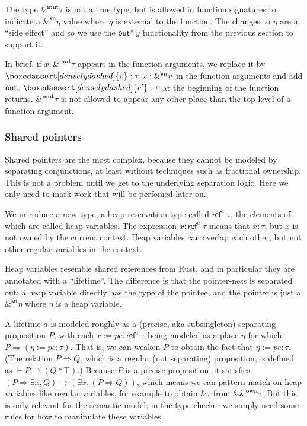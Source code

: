 \documentclass[acmsmall,nonacm]{acmart}
\newcommand*{\ghost}[1]{\boxedassert[densely dashed]{#1}}
\newcommand{\proves}{\vdash}
\begin{document}
The type $\&^\mathbf{mut}\tau$ is not a true type, but is allowed in function signatures to indicate a $\&^\mathbf{sn}\eta$ value where $\eta$ is external to the function. The changes to $\eta$ are a ``side effect'' and so we use the $\mathsf{out}^x\;y$ functionality from the previous section to support it.

In brief, if $x:\&^\mathbf{mut}\tau$ appears in the function arguments, we replace it by $\ghost v:\tau,x:\&^\mathbf{sn}v$ in the function arguments and add $\mathsf{out}_v\;\ghost{v'}:\tau$ at the beginning of the function returns. $\&^\mathbf{mut}\tau$ is not allowed to appear any other place than the top level of a function argument.

\subsubsection{Shared pointers}

Shared pointers are the most complex, because they cannot be modeled by separating conjunctions, at least without techniques such as fractional ownership. This is not a problem until we get to the underlying separation logic. Here we only need to mark work that will be perfomed later on.

We introduce a new type, a heap reservation type called $\mathsf{ref}^a\;\tau$, the elements of which are called heap variables. The expression $x:\mathsf{ref}^a\;\tau$ means that $x:\tau$, but $x$ is not owned by the current context. Heap variables can overlap each other, but not other regular variables in the context.

Heap variables resemble shared references from Rust, and in particular they are annotated with a ``lifetime''. The difference is that the pointer-ness is separated out; a heap variable directly has the type of the pointee, and the pointer is just a $\&^\mathbf{sn}\eta$ where $\eta$ is a heap variable.

A lifetime $a$ is modeled roughly as a (precise, aka subsingleton) separating proposition $P$, with each $x:=pe:\mathsf{ref}^a\;\tau$ being modeled as a place $\eta$ for which $P\Rightarrow (\eta:=pe:\tau)$. That is, we can weaken $P$ to obtain the fact that $\eta:=pe:\tau$. (The relation $P\Rightarrow Q$, which is a regular (not separating) proposition, is defined as $\proves P\to (Q*\top)$.) Because $P$ is a precise proposition, it satisfies $(P\Rightarrow \exists x, Q)\to (\exists x,(P\Rightarrow Q))$, which means we can pattern match on heap variables like regular variables, for example to obtain $\&\tau$ from $\&\&^\mathbf{own}\tau$. But this is only relevant for the semantic model; in the type checker we simply need some rules for how to manipulate these variables.
\end{document}
